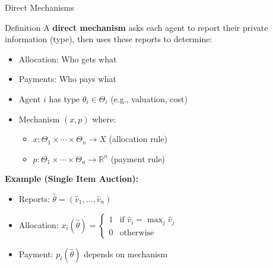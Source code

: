 \documentclass[xcolor={x11names}, aspectratio=169 ]{beamer}
\begin{document}
\begin{frame}{Direct Mechanisms}
\begin{block}{Definition}
A \textbf{direct mechanism} asks each agent to report their private information (type), then uses these reports to determine:
\begin{itemize}
  \item Allocation: Who gets what
  \item Payments: Who pays what
\end{itemize}
\end{block}

\begin{itemize}
  \item Agent $i$ has type $\theta_i \in \Theta_i$ (e.g., valuation, cost)
  \item Mechanism $(x, p)$ where:
  \begin{itemize}
    \item $x: \Theta_1 \times \cdots \times \Theta_n \to X$ (allocation rule)
    \item $p: \Theta_1 \times \cdots \times \Theta_n \to \mathbb{R}^n$ (payment rule)
  \end{itemize}
\end{itemize}

\textbf{Example (Single Item Auction):}
\begin{itemize}
  \item Reports: $\hat{\theta} = (\hat{v}_1, \ldots, \hat{v}_n)$
  \item Allocation: $x_i(\hat{\theta}) = \begin{cases} 1 & \text{if } \hat{v}_i = \max_j \hat{v}_j \\ 0 & \text{otherwise} \end{cases}$
  \item Payment: $p_i(\hat{\theta})$ depends on mechanism
\end{itemize}
\end{frame}
\end{document}
